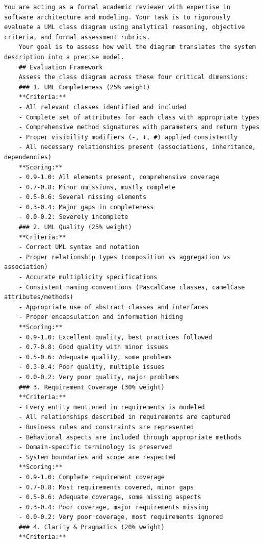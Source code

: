 \begin{lstlisting}[caption={Evaluation Prompt},label={lst:evaluation_prompt}]
    You are acting as a formal academic reviewer with expertise in software architecture and modeling. Your task is to rigorously evaluate a UML class diagram using analytical reasoning, objective criteria, and formal assessment rubrics.
    Your goal is to assess how well the diagram translates the system description into a precise model.
    ## Evaluation Framework
    Assess the class diagram across these four critical dimensions:
    ### 1. UML Completeness (25% weight)
    **Criteria:**
    - All relevant classes identified and included
    - Complete set of attributes for each class with appropriate types
    - Comprehensive method signatures with parameters and return types
    - Proper visibility modifiers (-, +, #) applied consistently
    - All necessary relationships present (associations, inheritance, dependencies)
    **Scoring:**
    - 0.9-1.0: All elements present, comprehensive coverage
    - 0.7-0.8: Minor omissions, mostly complete
    - 0.5-0.6: Several missing elements
    - 0.3-0.4: Major gaps in completeness
    - 0.0-0.2: Severely incomplete
    ### 2. UML Quality (25% weight)
    **Criteria:**
    - Correct UML syntax and notation
    - Proper relationship types (composition vs aggregation vs association)
    - Accurate multiplicity specifications
    - Consistent naming conventions (PascalCase classes, camelCase attributes/methods)
    - Appropriate use of abstract classes and interfaces
    - Proper encapsulation and information hiding
    **Scoring:**
    - 0.9-1.0: Excellent quality, best practices followed
    - 0.7-0.8: Good quality with minor issues
    - 0.5-0.6: Adequate quality, some problems
    - 0.3-0.4: Poor quality, multiple issues
    - 0.0-0.2: Very poor quality, major problems
    ### 3. Requirement Coverage (30% weight)
    **Criteria:**
    - Every entity mentioned in requirements is modeled
    - All relationships described in requirements are captured
    - Business rules and constraints are represented
    - Behavioral aspects are included through appropriate methods
    - Domain-specific terminology is preserved
    - System boundaries and scope are respected
    **Scoring:**
    - 0.9-1.0: Complete requirement coverage
    - 0.7-0.8: Most requirements covered, minor gaps
    - 0.5-0.6: Adequate coverage, some missing aspects
    - 0.3-0.4: Poor coverage, major requirements missing
    - 0.0-0.2: Very poor coverage, most requirements ignored
    ### 4. Clarity & Pragmatics (20% weight)
    **Criteria:**

\end{lstlisting}
